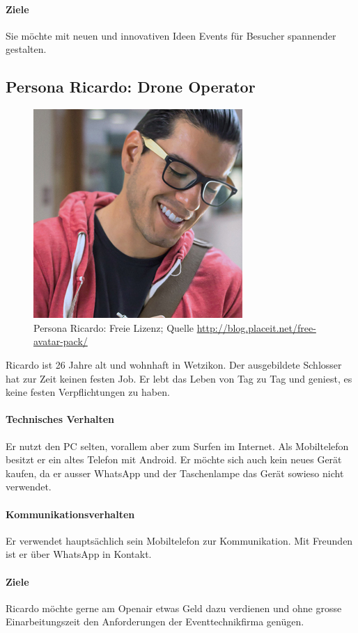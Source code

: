 \paragraph{Ziele}
Sie möchte mit neuen und innovativen Ideen Events für Besucher spannender gestalten.

\subsection{Persona Ricardo: Drone Operator}
\begin{figure}[h]
\centering
	\includegraphics[width=.35\textwidth]{images/persona-ricardo.jpg}
	\caption{Persona Ricardo: Freie Lizenz; Quelle
	 \protect\url{http://blog.placeit.net/free-avatar-pack/}}
	\label{fig:ricardo}
\end{figure}
Ricardo ist 26 Jahre alt und wohnhaft in Wetzikon. Der ausgebildete Schlosser hat zur Zeit keinen festen Job. Er lebt das Leben von Tag zu Tag und geniest, es keine festen Verpflichtungen zu haben.
\paragraph{Technisches Verhalten}
Er nutzt den PC selten, vorallem aber zum Surfen im Internet. Als Mobiltelefon besitzt er ein altes Telefon mit Android. Er möchte sich auch kein neues Gerät kaufen, da er ausser WhatsApp und der Taschenlampe das Gerät sowieso nicht verwendet.
\paragraph{Kommunikationsverhalten}
Er verwendet hauptsächlich sein Mobiltelefon zur Kommunikation. Mit Freunden ist er über WhatsApp in Kontakt.
\paragraph{Ziele}
Ricardo möchte gerne am Openair etwas Geld dazu verdienen und ohne grosse Einarbeitungszeit den Anforderungen der Eventtechnikfirma genügen.

